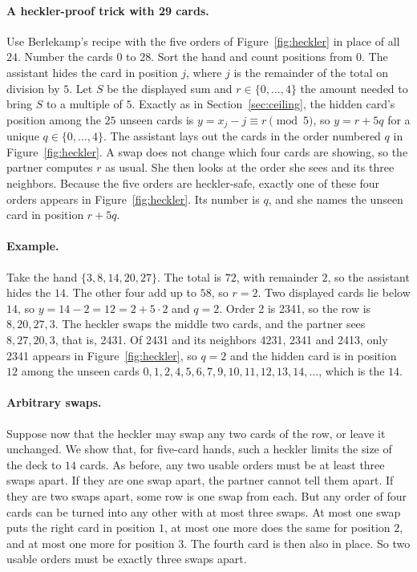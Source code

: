 \documentclass[11pt]{article}
\begin{document}
\paragraph{A heckler-proof trick with 29 cards.} Use Berlekamp's
recipe with the five orders of Figure~\ref{fig:heckler} in place of
all $24$. Number the cards $0$ to $28$. Sort the hand and count
positions from $0$. The assistant hides the card in position $j$,
where $j$ is the remainder of the total on division by $5$. Let $S$ be
the displayed sum and $r\in\{0,\ldots,4\}$ the amount needed to bring
$S$ to a multiple of $5$. Exactly as in Section~\ref{sec:ceiling}, the
hidden card's position among the $25$ unseen cards is $y=x_j-j\equiv
r\pmod 5$, so $y=r+5q$ for a unique $q\in\{0,\ldots,4\}$. The
assistant lays out the cards in the order numbered $q$ in
Figure~\ref{fig:heckler}. A swap does not change which four cards are
showing, so the partner computes $r$ as usual.
She then looks at the order she sees and its three neighbors. Because the five orders are heckler-safe, exactly one of these four orders appears in Figure~\ref{fig:heckler}. Its number is $q$, and she names the unseen card in position $r+5q$.


\paragraph{Example.} Take the hand $\{3,8,14,20,27\}$. The total is
$72$, with remainder $2$, so the assistant hides the $14$. The other
four add up to $58$, so $r=2$. Two displayed cards lie below $14$, so
$y=14-2=12=2+5\cdot2$ and $q=2$. Order 2 is 2341, so the row is
$8,20,27,3$. The heckler swaps the middle two cards, and the partner
sees $8,27,20,3$, that is, 2431. Of 2431 and its neighbors 4231, 2341
and 2413, only 2341 appears in Figure~\ref{fig:heckler}, so $q=2$ and
the hidden card is in position $12$ among the unseen cards
$0,1,2,4,5,6,7,9,10,11,12,13,14,\dots$, which is the $14$. 

\paragraph{Arbitrary swaps.} Suppose now that the heckler may swap any
two cards of the row, or leave it unchanged.
We show that, for five-card hands, such a heckler limits the size of the deck to $14$ cards.
As before, any two usable orders must be at least three swaps apart. If they are one swap apart, the partner cannot tell them apart. If they are two swaps apart, some row is one swap from each. But any order of four cards can be turned into any other with at most three swaps. At most one swap puts the right card in position $1$, at most one more does the same for position $2$, and at most one more for position $3$. The fourth card is then also in place.
So two usable orders must be exactly three
swaps apart. 
\end{document}
